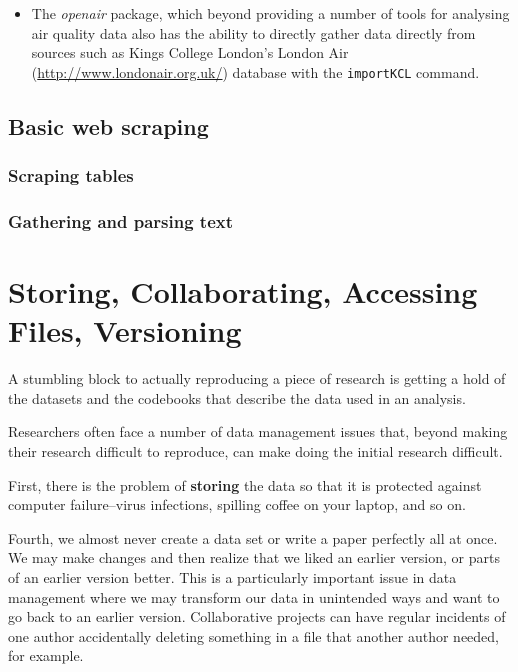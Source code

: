 \documentclass[ChapterTOCs,krantz1]{krantz}\usepackage{graphicx, color}
\begin{document}
\begin{itemize}
    \item The \emph{openair} package, which beyond providing a number of tools for analysing air quality data also has the ability to directly gather data directly from sources such as Kings College London's London Air (\url{http://www.londonair.org.uk/}) database with the \texttt{importKCL} command.
\end{itemize}

\section{Basic web scraping}

\subsection{Scraping tables}

\subsection{Gathering and parsing text}





\chapter{Storing, Collaborating, Accessing Files, Versioning}\label{Storing}

A stumbling block to actually reproducing a piece of research is getting a hold of the datasets and the codebooks that describe the data used in
an analysis.

Researchers often face a number of data management issues that, beyond
making their research difficult to reproduce, can make doing the initial
research difficult.

First, there is the problem of \textbf{storing} the data so that it is
protected against computer failure--virus infections, spilling coffee on
your laptop, and so on.

Fourth, we almost never create a data set or write a paper perfectly all
at once. We may make changes and then realize that we liked an earlier
version, or parts of an earlier version better. This is a particularly
important issue in data management where we may transform our data in
unintended ways and want to go back to an earlier version. Collaborative
projects can have regular incidents of one author accidentally deleting
something in a file that another author needed, for example.
\end{document}
